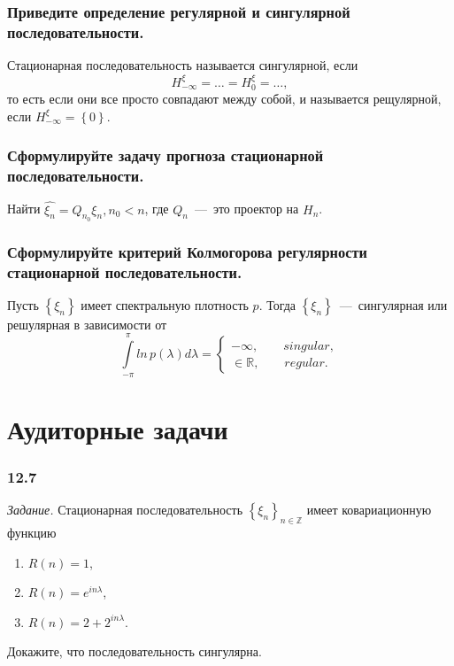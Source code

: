 \subsubsection*{Приведите определение регулярной и сингулярной последовательности.}

Стационарная последовательность называется сингулярной, если
\begin{equation*}
  H_{-\infty }^{ \xi } =
  \dotsc =
  H_0^{ \xi } =
  \dotsc,
\end{equation*}
то есть если они все просто совпадают между собой, и называется рещулярной,
если $H_{-\infty }^{ \xi } = \left\{ 0 \right\} $.

\subsubsection*{Сформулируйте задачу прогноза стационарной последовательности.}

Найти $ \hat{ \xi_n} = Q_{n_0} \xi_n, n_0 < n$, где $Q_n$~---~это проектор на $H_n$.

\subsubsection*{Сформулируйте критерий Колмогорова регулярности стационарной последовательности.}

Пусть $ \left\{ \xi_n \right\} $ имеет спектральную плотность $p$.
Тогда $ \left\{ \xi_n \right\} $~---~сингулярная или решулярная в зависимости от
\begin{equation*}
  \int \limits_{-\pi }^{ \pi } ln \, p \left( \lambda \right) d \lambda =
  \begin{cases}
    -\infty, \qquad singular, \\
    \in \mathbb{R}, \qquad regular.
  \end{cases}
\end{equation*}

\section*{Аудиторные задачи}

\subsubsection*{12.7}

\textit{Задание.}
Стационарная последовательность $ \left\{ \xi_n \right\}_{n \in \mathbb{Z}}$
имеет ковариационную функцию
\begin{enumerate}[label=\alph*)]
  \item $R \left( n \right) = 1$,
  \item $R \left( n \right) = e^{in \lambda }$,
  \item $R \left( n \right) = 2 + 2^{in \lambda }$.
\end{enumerate}
Докажите, что последовательность сингулярна.

